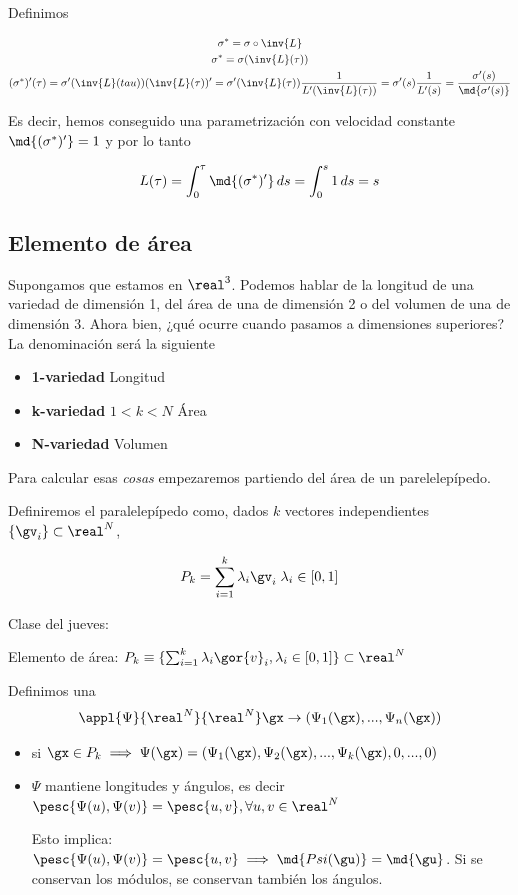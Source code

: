 Definimos

\begin{gather*}
\sigma^\ast = \sigma \circ \inv{L} \\
\sigma^\ast = \sigma(\inv{L}(\tau)) \\
(\sigma^\ast)'(\tau) = \sigma'(\inv{L}(tau)) (\inv{L}(\tau))' = \sigma'(\inv{L}(\tau)) \frac{1}{L'(\inv{L}(\tau))} = \sigma'(s) \frac{1}{L'(s)} = \frac{\sigma'(s)}{\md{\sigma'(s)}}
\end{gather*}

Es decir, hemos conseguido una parametrización con velocidad constante $\md{(\sigma^\ast)'} = 1$ y por lo tanto

\[ L(\tau) = \int_0^\tau \md{(\sigma^\ast)'}\,ds = \int_0^s 1\,ds = s \]

\subsection{Elemento de área}

Supongamos que estamos en $\real^3$. Podemos hablar de la longitud de una variedad de dimensión 1, del área de una de dimensión 2 o del volumen de una de dimensión 3. Ahora bien, ¿qué ocurre cuando pasamos a dimensiones superiores? La denominación será la siguiente

\begin{itemize}
\item \textbf{1-variedad} Longitud
\item \textbf{k-variedad} $1<k<N$ Área
\item \textbf{N-variedad} Volumen
\end{itemize}

Para calcular esas \textit{cosas} empezaremos partiendo del área de un parelelepípedo.

Definiremos el paralelepípedo como, dados $k$ vectores independientes $\{\gv_i\} \subset \real^N$, 

\[ P_k = \sum_{i=1}^k \lambda_i\gv_i\;\lambda_i \in [0,1] \]

Clase del jueves:


Elemento de área: $P_k \equiv \{ \sum_{i=1}^k \lambda_i\gor{v}_i, \lambda_i \in [0,1]\}\subset \real^N$

Definimos una \begin{gather*}
\appl{\Psi}{\real^N}{\real^N}
\gx \rightarrow (\Psi_1(\gx),...,\Psi_n(\gx))
\end{gather*}

\begin{itemize}
\item si $\gx \in P_k \implies \Psi(\gx) = (\Psi_1(\gx),\Psi_2(\gx),...,\Psi_k(\gx),0,...,0)$
\item $\Psi$ mantiene longitudes y ángulos, es decir $\pesc{\Psi(u),\Psi(v)}=\pesc{u,v}, \forall u,v\in\real^N$

Esto implica: $\pesc{\Psi(u),\Psi(v)}=\pesc{u,v} \implies \md{Psi(\gu)} = \md{\gu}$. Si se conservan los módulos, se conservan también los ángulos.
\end{itemize}

